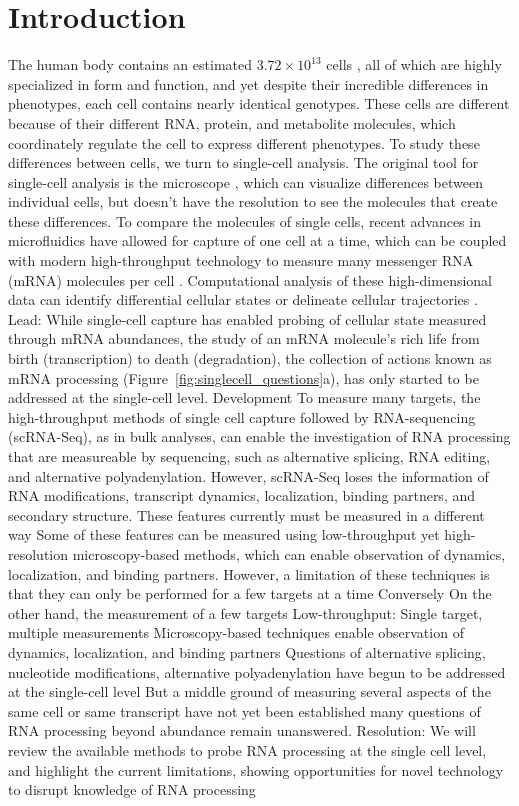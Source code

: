 \section{Introduction}
The human body contains an estimated $3.72 \times 10^{13}$ cells \cite{Bianconi2013-jr}, all of which are highly specialized in form and function, and yet despite their incredible differences in phenotypes, each cell contains nearly identical genotypes. These cells are different because of their different RNA, protein, and metabolite molecules, which coordinately regulate the cell to express different phenotypes. To study these differences between cells, we turn to single-cell analysis.
The original tool for single-cell analysis is the microscope \cite{Hooke1665-bk,Van_Leeuwenhoek_undated-gu}, which can visualize differences between individual cells, but doesn't have the resolution to see the molecules that create these differences. To compare the molecules of single cells, recent advances in microfluidics have allowed for capture of one cell at a time, which can be coupled with modern high-throughput technology to measure many messenger RNA (mRNA) molecules per cell \cite{Kolodziejczyk:2015dj,Ziegenhain:2017kr}. Computational analysis of these high-dimensional data can identify differential cellular states or delineate cellular trajectories \cite{Bacher:2016jq,Cannoodt2016-mt,Liu:2016fd,Trapnell:2015er,Stegle:2015cx}.
Lead:
While single-cell capture has enabled probing of cellular state measured through mRNA abundances, the study of an mRNA molecule's rich life from birth (transcription) to death (degradation), the collection of actions known as mRNA processing (Figure~\ref{fig:singlecell_questions}a), has only started to be addressed at the single-cell level.
Development
To measure many targets, the high-throughput methods of single cell capture followed by RNA-sequencing (scRNA-Seq), as in bulk analyses, can enable the investigation of RNA processing that are measureable by sequencing, such as alternative splicing, RNA editing, and alternative polyadenylation.
However, scRNA-Seq loses the information of RNA modifications, transcript dynamics, localization, binding partners, and secondary structure.
These features currently must be measured in a different way
Some of these features can be measured using low-throughput yet high-resolution microscopy-based methods, which can enable observation of dynamics, localization, and binding partners.
However, a limitation of these techniques is that they can only be performed for a few targets at a time
Conversely
On the other hand, the measurement of a few targets
Low-throughput: Single target, multiple measurements
Microscopy-based techniques enable observation of dynamics, localization, and binding partners
Questions of alternative splicing, nucleotide modifications, alternative polyadenylation have begun to be addressed at the single-cell level
But a middle ground of measuring several aspects of the same cell or same transcript have not yet been established
many questions of RNA processing beyond abundance remain unanswered.
Resolution:
We will review the available methods to probe RNA processing at the single cell level, and highlight the current limitations, showing opportunities for novel technology to disrupt knowledge of RNA processing

